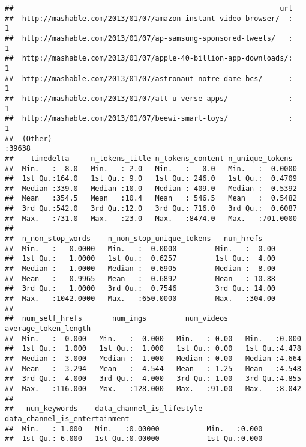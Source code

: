 \documentclass[]{article}
\begin{document}
\begin{verbatim}
##                                                              url       
##  http://mashable.com/2013/01/07/amazon-instant-video-browser/  :    1  
##  http://mashable.com/2013/01/07/ap-samsung-sponsored-tweets/   :    1  
##  http://mashable.com/2013/01/07/apple-40-billion-app-downloads/:    1  
##  http://mashable.com/2013/01/07/astronaut-notre-dame-bcs/      :    1  
##  http://mashable.com/2013/01/07/att-u-verse-apps/              :    1  
##  http://mashable.com/2013/01/07/beewi-smart-toys/              :    1  
##  (Other)                                                       :39638  
##    timedelta     n_tokens_title n_tokens_content n_unique_tokens   
##  Min.   :  8.0   Min.   : 2.0   Min.   :   0.0   Min.   :  0.0000  
##  1st Qu.:164.0   1st Qu.: 9.0   1st Qu.: 246.0   1st Qu.:  0.4709  
##  Median :339.0   Median :10.0   Median : 409.0   Median :  0.5392  
##  Mean   :354.5   Mean   :10.4   Mean   : 546.5   Mean   :  0.5482  
##  3rd Qu.:542.0   3rd Qu.:12.0   3rd Qu.: 716.0   3rd Qu.:  0.6087  
##  Max.   :731.0   Max.   :23.0   Max.   :8474.0   Max.   :701.0000  
##                                                                    
##  n_non_stop_words    n_non_stop_unique_tokens   num_hrefs     
##  Min.   :   0.0000   Min.   :  0.0000         Min.   :  0.00  
##  1st Qu.:   1.0000   1st Qu.:  0.6257         1st Qu.:  4.00  
##  Median :   1.0000   Median :  0.6905         Median :  8.00  
##  Mean   :   0.9965   Mean   :  0.6892         Mean   : 10.88  
##  3rd Qu.:   1.0000   3rd Qu.:  0.7546         3rd Qu.: 14.00  
##  Max.   :1042.0000   Max.   :650.0000         Max.   :304.00  
##                                                               
##  num_self_hrefs       num_imgs         num_videos    average_token_length
##  Min.   :  0.000   Min.   :  0.000   Min.   : 0.00   Min.   :0.000       
##  1st Qu.:  1.000   1st Qu.:  1.000   1st Qu.: 0.00   1st Qu.:4.478       
##  Median :  3.000   Median :  1.000   Median : 0.00   Median :4.664       
##  Mean   :  3.294   Mean   :  4.544   Mean   : 1.25   Mean   :4.548       
##  3rd Qu.:  4.000   3rd Qu.:  4.000   3rd Qu.: 1.00   3rd Qu.:4.855       
##  Max.   :116.000   Max.   :128.000   Max.   :91.00   Max.   :8.042       
##                                                                          
##   num_keywords    data_channel_is_lifestyle data_channel_is_entertainment
##  Min.   : 1.000   Min.   :0.00000           Min.   :0.000                
##  1st Qu.: 6.000   1st Qu.:0.00000           1st Qu.:0.000                

\end{verbatim}
\end{document}
